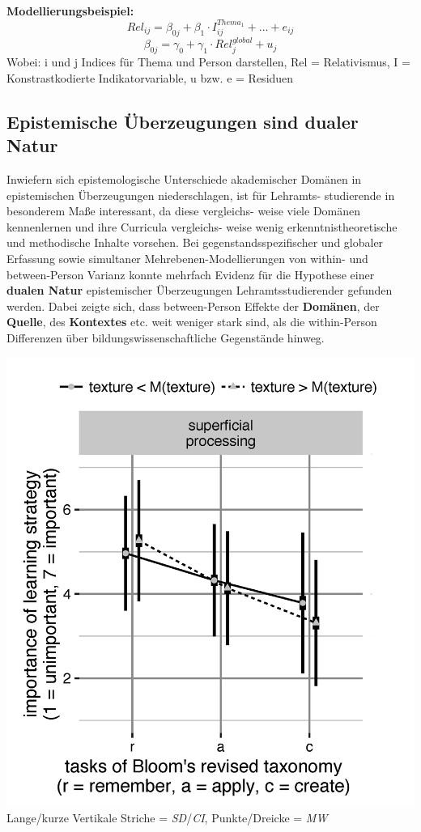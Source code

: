 \documentclass[]{tufte-handout}
\begin{document}
\begin{marginfigure}
\textbf{Modellierungsbeispiel:}
\[Rel_{ij} = \beta_{0j} + \beta_{1} \cdot  I^{Thema_1}_{ij} + ... + e_{ij}\]
\[\beta_{0j} = \gamma_{0} + \gamma_{1} \cdot Rel^{global}_{j} + u_{j}\]
Wobei: i und j Indices für Thema und Person darstellen, Rel =
Relativismus, I = Konstrastkodierte Indikatorvariable, u bzw. e =
Residuen
\end{marginfigure}

\subsection{Epistemische Überzeugungen sind dualer
Natur}\label{epistemische-uberzeugungen-sind-dualer-natur}

Inwiefern sich epistemologische Unterschiede akademischer Domänen in
epistemischen Überzeugungen niederschlagen, ist für Lehramts-
studierende in besonderem Maße interessant, da diese vergleichs- weise
viele Domänen kennenlernen und ihre Curricula vergleichs- weise wenig
erkenntnistheoretische und methodische Inhalte vorsehen. Bei
gegenstandsspezifischer und globaler Erfassung sowie simultaner
Mehrebenen-Modellierungen von within- und between-Person Varianz konnte
mehrfach Evidenz für die Hypothese einer \textbf{dualen Natur}
epistemischer Überzeugungen Lehramtsstudierender gefunden werden. Dabei
zeigte sich, dass between-Person Effekte der \textbf{Domänen}, der
\textbf{Quelle}, des \textbf{Kontextes} etc. weit weniger stark sind,
als die within-Person Differenzen über bildungswissenschaftliche
Gegenstände hinweg.

\begin{marginfigure}
\includegraphics{../Img/Kalibrierung_sup4.png} Lange/kurze Vertikale
Striche = \emph{SD}/\emph{CI}, Punkte/Dreicke = \emph{MW}
\end{marginfigure}
\end{document}
